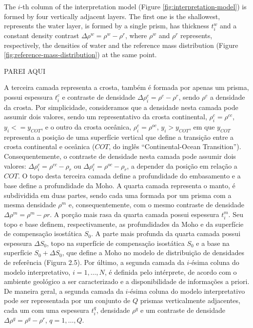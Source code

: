 \documentclass[manuscript]{geophysics}
\begin{document}
The $i$-th column of the interpretation model 
(Figure \ref{fig:interpretation-model}) is formed by four vertically adjacent 
layers. The first one is the shallowest, represents the water layer, is formed by 
a single prism, has thickness $t^{w}_{i}$ and a constant density contrast 
$\Delta \rho^{w} = \rho^{w} - \rho^{r}$, where $\rho^{w}$ and $\rho^{r}$ 
represents, respectively, the densities of water and the reference mass 
distribution (Figure \ref{fig:reference-mass-distribution}) at the same point. 

PAREI AQUI

A terceira camada representa a crosta, também é formada por apenas um prisma, possui espessura $t^{c}_{i}$ e contraste de densidade $\Delta \rho^{c}_{i} = \rho^{c} - \rho^{r}$, sendo $\rho^{c}$ a densidade da crosta. Por simplicidade, consideramos que a densidade nesta camada pode assumir dois valores, sendo um representativo da crosta continental, $\rho^{c}_{i} = \rho^{cc}$, $y_{i} <= y_{COT}$, e o outro da crosta oceânica, $\rho^{c}_{i} = \rho^{oc}$, $y_{i} > y_{COT}$, em que $y_{COT}$ representa a posição de uma superfície vertical que define a transição entre a crosta continental e oceânica ($COT$, do inglês “Continental-Ocean Transition”). Consequentemente, o contraste de densidade nesta camada pode assumir dois valores: $\Delta \rho^{c}_{i} = \rho^{cc} - \rho_{r}$ ou $\Delta \rho^{c}_{i} = \rho^{oc} - \rho_{r}$, a depender da posição em relação a $COT$. O topo desta terceira camada define a profundidade do embasamento e a base define a profundidade da Moho. A quarta camada representa o manto, é subdividida em duas partes, sendo cada uma formada por um prisma com a mesma densidade $\rho^{m}$ e, consequentemente, com o mesmo contraste de densidade $\Delta \rho^{m} = \rho^{m} - \rho {r}$. A porção mais rasa da quarta camada possui espessura $t^{m}_{i}$. Seu topo e base definem, respectivamente, as profundidades da Moho e da superfície de compensação isostática $S_{0}$. A parte mais profunda da quarta camada possui espessura $\Delta S_{0}$, topo na superfície de compensação isostática $S_{0}$ e a base na superfície $S_{0} + \Delta S_{0}$, que define a Moho no modelo de distribuição de densidades de referência (Figura 2.5). Por último, a segunda camada da $i$-ésima coluna do modelo interpretativo, $i = 1, …, N$, é definida pelo intérprete, de acordo com o ambiente geológico a ser caracterizado e a disponibilidade de informações a priori. De maneira geral, a segunda camada da $i$-ésima coluna do modelo interpretativo pode ser representada por um conjunto de $Q$ prismas verticalmente adjacentes, cada um com uma espessura $t^{q}_{i}$, densidade $\rho^{q}$ e um contraste de densidade  $\Delta \rho^{q} = \rho^{q} - \rho^{r}$, $q = 1, …, Q$.
\end{document}

